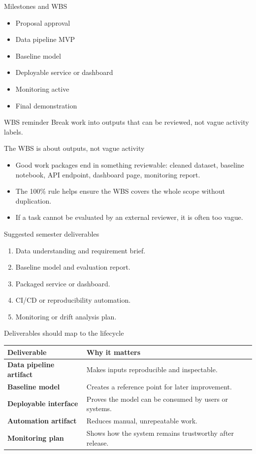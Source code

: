 \begin{frame}{Milestones and WBS}
\begin{itemize}
\item Proposal approval
\item Data pipeline MVP
\item Baseline model
\item Deployable service or dashboard
\item Monitoring active
\item Final demonstration
\end{itemize}
\begin{block}{WBS reminder}
Break work into outputs that can be reviewed, not vague activity labels.
\end{block}
\coursefooter
\end{frame}

\begin{frame}{The WBS is about outputs, not vague activity}
\begin{itemize}
\item Good work packages end in something reviewable: cleaned dataset, baseline notebook, API endpoint, dashboard page, monitoring report.
\item The 100\% rule helps ensure the WBS covers the whole scope without duplication.
\item If a task cannot be evaluated by an external reviewer, it is often too vague.
\end{itemize}
\coursefooter
\end{frame}

\begin{frame}{Suggested semester deliverables}
\begin{enumerate}
\item Data understanding and requirement brief.
\item Baseline model and evaluation report.
\item Packaged service or dashboard.
\item CI/CD or reproducibility automation.
\item Monitoring or drift analysis plan.
\end{enumerate}
\coursefooter
\end{frame}

\begin{frame}{Deliverables should map to the lifecycle}
\begin{tabularx}{\textwidth}{>{\bfseries}l X}
Deliverable & Why it matters \\
\toprule
Data pipeline artifact & Makes inputs reproducible and inspectable. \\
Baseline model & Creates a reference point for later improvement. \\
Deployable interface & Proves the model can be consumed by users or systems. \\
Automation artifact & Reduces manual, unrepeatable work. \\
Monitoring plan & Shows how the system remains trustworthy after release. \\
\bottomrule
\end{tabularx}
\coursefooter
\end{frame}

